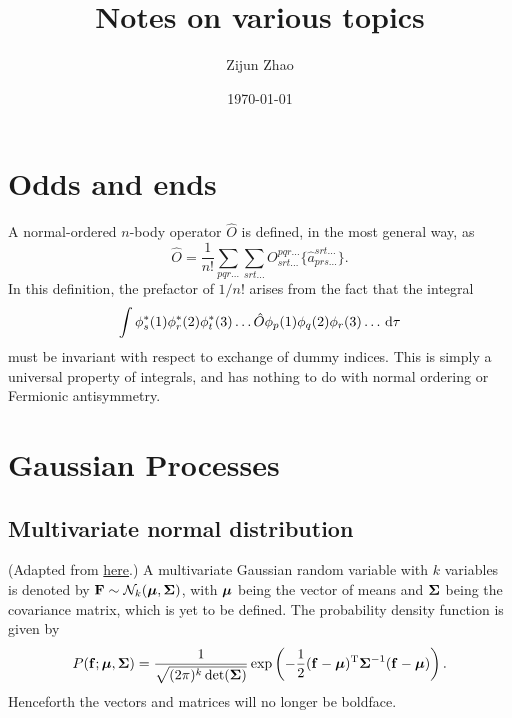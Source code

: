 \documentclass{article}
\begin{document}
\title{Notes on various topics}

\author{Zijun Zhao}

\date{\today}
\maketitle
\tableofcontents
\section{Odds and ends}
\begin{definition}
    A normal-ordered $n$-body operator $\hat{O}$ is defined, in the most general way, as 
    \begin{equation}
        \hat{O}=\frac{1}{n!}\sum_{pqr\dots}\sum_{srt\dots}O^{pqr\dots}_{srt\dots}\{\hat{a}^{srt\dots}_{prs\dots} \}.
    \end{equation}
    In this definition, the prefactor of $1/n!$ arises from the fact that the integral
    \begin{equation}
        \int \phi_s^*(1)\phi_r^*(2)\phi_t^*(3)\dots \hat{O} \phi_p(1)\phi_q(2)\phi_r(3)\dots\dl \tau
    \end{equation}
    must be invariant with respect to exchange of dummy indices. This is simply a universal property of integrals, and has nothing to do with normal ordering or Fermionic antisymmetry.
\end{definition}

\section{Gaussian Processes}
\subsection{Multivariate normal distribution}
(Adapted from \href{http://www.cs.cornell.edu/courses/cs4780/2018fa/lectures/lecturenote15.html}{here}.) A multivariate Gaussian random variable with $k$ variables is denoted by $\bm{\mathrm{F}}\sim\mathcal{N}_k(\bm{\mathrm{\mu}},\bm{\mathrm{\Sigma}})$, with $\bm{\mathrm{\mu}}$ being the vector of means and $\bm{\mathrm{\Sigma}}$ being the covariance matrix, which is yet to be defined. The probability density function is given by
\begin{equation}
P(\bm{\mathrm{f}};\bm{\mathrm{\mu}},\bm{\mathrm{\Sigma}})=\frac{1}{\sqrt{(2\pi)^{k}\det(\bm{\mathrm{\Sigma}})}}\exp\left( -\frac{1}{2}(\bm{\mathrm{f}}-\bm{\mathrm{\mu}})^{\mathrm{T}}\bm{\mathrm{\Sigma}}^{-1}(\bm{\mathrm{f}}-\bm{\mathrm{\mu}}) \right).
\end{equation}
Henceforth the vectors and matrices will no longer be boldface.
\end{document}
